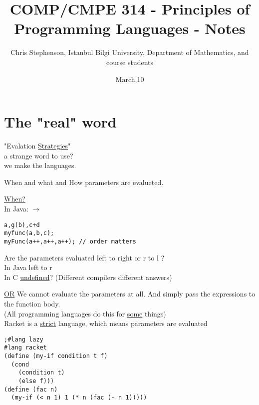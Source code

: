 \documentclass{article}
\begin{document}
\title{COMP/CMPE 314 - Principles of Programming Languages - Notes}
\author{Chris Stephenson, Istanbul Bilgi University, Department of Mathematics, and course students}
\date{March,10}
\maketitle

\section*{The "real" word}
\begin{flushleft}
"Evalation \underline{Strategies}"\\
a strange word to use?\\
we make the languages.     
\end{flushleft}

\doublespacing
\begin{flushleft}
When and what and How parameters are evalueted.
\end{flushleft}

\doublespacing
\begin{flushleft}
\underline{When?}\\
In Java: $\rightarrow$
\begin{verbatim}
a,g(b),c+d
myfunc(a,b,c);
myFunc(a++,a++,a++); // order matters
\end{verbatim}
\end{flushleft}

\begin{flushleft}
Are the parameters evaluated left to right or r to l ?\\
In Java left to r\\
In C \underline{undefined}? (Different compilers different answers)
\end{flushleft}

\doublespacing
\begin{flushleft}
\underline{OR} We cannot evaluate the parameters at all. And simply pass the expressions to the function body.\\
(All programming languages do this for \underline{some} things)\\
Racket is a \underline{strict} language, which means parameters are evaluated 
\end{flushleft}

\begin{verbatim}
;#lang lazy
#lang racket
(define (my-if condition t f)
  (cond
    (condition t)
    (else f)))
(define (fac n)
  (my-if (< n 1) 1 (* n (fac (- n 1)))))
\end{verbatim}
%
\end{document}
